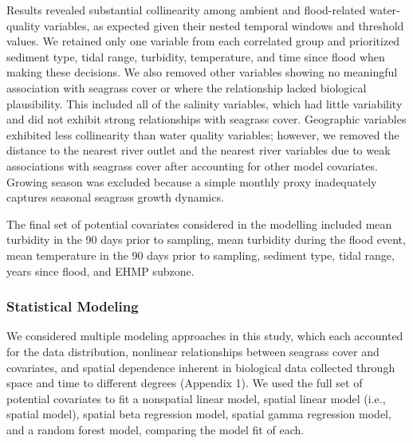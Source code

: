 \documentclass[
  letterpaper,
  DIV=11,
  numbers=noendperiod]{scrartcl}
\begin{document}
Results revealed substantial collinearity among ambient and
flood-related water-quality variables, as expected given their nested
temporal windows and threshold values. We retained only one variable
from each correlated group and prioritized sediment type, tidal range,
turbidity, temperature, and time since flood when making these
decisions. We also removed other variables showing no meaningful
association with seagrass cover or where the relationship lacked
biological plausibility. This included all of the salinity variables,
which had little variability and did not exhibit strong relationships
with seagrass cover. Geographic variables exhibited less collinearity
than water quality variables; however, we removed the distance to the
nearest river outlet and the nearest river variables due to weak
associations with seagrass cover after accounting for other model
covariates. Growing season was excluded because a simple monthly proxy
inadequately captures seasonal seagrass growth dynamics.

The final set of potential covariates considered in the modelling
included mean turbidity in the 90 days prior to sampling, mean turbidity
during the flood event, mean temperature in the 90 days prior to
sampling, sediment type, tidal range, years since flood, and EHMP
subzone.

\subsubsection{Statistical Modeling}\label{sec-mb_model}

We considered multiple modeling approaches in this study, which each
accounted for the data distribution, nonlinear relationships between
seagrass cover and covariates, and spatial dependence inherent in
biological data collected through space and time to different degrees
(Appendix 1). We used the full set of potential covariates to fit a
nonspatial linear model, spatial linear model (i.e., spatial model),
spatial beta regression model, spatial gamma regression model, and a
random forest model, comparing the model fit of each.
\end{document}
